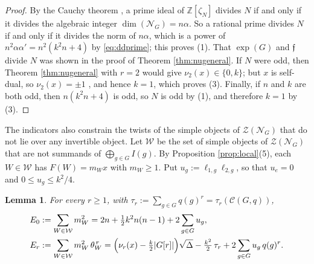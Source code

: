 \documentclass[10pt]{article}
\theoremstyle{plain}
\newtheorem{lemma}[theorem]{Lemma}
\theoremstyle{definition}
\theoremstyle{plain}
\begin{document}
\begin{proof}
By the Cauchy theorem \cite[Theorem~3.9]{MR3486174}, a prime ideal of $\mathbb{Z}[\zeta_N]$ divides $N$ if and only if it divides the algebraic integer $\dim(\mathcal{N}_G)=n\alpha$. So a rational prime divides $N$ if and only if it divides the norm of $n\alpha$, which is a power of $n^2\alpha\alpha'=n^2(k^2n+4)$ by \eqref{eq:ddprime}; this proves (1). That $\exp(G)$ and $\mathfrak{f}$ divide $N$ was shown in the proof of Theorem \ref{thm:nugeneral}. If $N$ were odd, then Theorem \ref{thm:nugeneral} with $r=2$ would give $\nu_2(x)\in\{0,k\}$; but $x$ is self-dual, so $\nu_2(x)=\pm1$ \cite[Theorem 2.7]{MR3427429}, and hence $k=1$, which proves (3). Finally, if $n$ and $k$ are both odd, then $n(k^2n+4)$ is odd, so $N$ is odd by (1), and therefore $k=1$ by (3).
\end{proof}

\par The indicators also constrain the twists of the simple objects of $\mathcal{Z}(\mathcal{N}_G)$ that do not lie over any invertible object. Let $\mathcal{W}$ be the set of simple objects of $\mathcal{Z}(\mathcal{N}_G)$ that are not summands of $\bigoplus_{g\in G}I(g)$. By Proposition \ref{prop:local}(5), each $W\in\mathcal{W}$ has $F(W)=m_Wx$ with $m_W\geq1$. Put $u_g:=\ell_{1,g}\ell_{2,g}$, so that $u_e=0$ and $0\leq u_g\leq k^2/4$.

\begin{lemma}\label{lem:moments}
For every $r\geq1$, with $\tau_r:=\sum_{g\in G}q(g)^r=\tau_r(\mathcal{C}(G,q))$,
\begin{align*}
E_0&:=\sum_{W\in\mathcal{W}}m_W^2=2n+\tfrac12k^2n(n-1)+2\sum_{g\in G}u_g,\\
E_r&:=\sum_{W\in\mathcal{W}}m_W^2\,\theta_W^{\,r}=\Bigl(\nu_r(x)-\tfrac k2|G[r]|\Bigr)\sqrt\Delta-\tfrac{k^2}{2}\,\tau_r+2\sum_{g\in G}u_g\,q(g)^r .
\end{align*}
\end{lemma}
\end{document}
